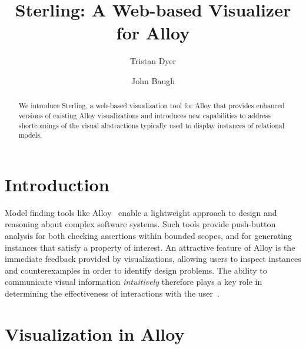 \documentclass[runningheads]{llncs}
\begin{document}
\title{Sterling: A Web-based Visualizer for Alloy}
\author{Tristan Dyer  \and John Baugh }



\maketitle

\begin{abstract}
We introduce Sterling, a web-based visualization tool for Alloy that provides enhanced versions of existing Alloy visualizations and introduces new capabilities to address shortcomings of the visual abstractions typically used to display instances of relational models. 
\end{abstract}


\section{Introduction}
\label{introduction}

Model finding tools like Alloy~\cite{jackson2012} enable a lightweight approach to design and reasoning about complex software systems. Such tools provide push-button analysis for both checking assertions within bounded scopes, and for generating instances that satisfy a property of interest. An attractive feature of Alloy is the immediate feedback provided by visualizations, allowing users to inspect instances and counterexamples in order to identify design problems. The ability to communicate visual information \emph{intuitively} therefore plays a key role in determining the effectiveness of interactions with the user~\cite{gammaitoni2014}.

\section{Visualization in Alloy}
\label{alloy-vis}
\end{document}
